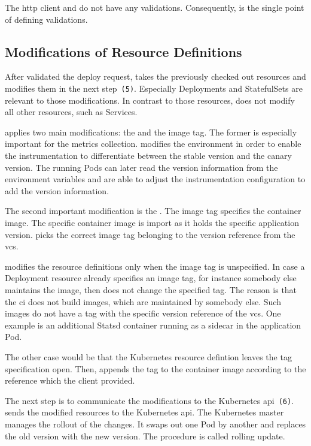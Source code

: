 The \gls{http} client and \depctl{} do not have any validations. Consequently, \deployer{} is the
single point of defining validations.

\subsection{Modifications of Resource Definitions}

After \deployer{} validated the deploy request, \deployer{} takes the previously checked out
resources and modifies them in the next step~\texttt{(5)}. Especially Deployments and
StatefulSets are relevant to those modifications. In contrast to those resources, \deployer{}
does not modify all other resources, such as Services.

\deployer{} applies two main modifications: the  and the image tag. The
former is especially important for the metrics collection. \deployer{} modifies the
environment in order to enable the instrumentation to differentiate between the stable
version and the canary version. The running Pods can later read the version information
from the environment variables and are able to adjust the instrumentation configuration to
add the version information.

The second important modification is the . The image tag specifies the
container image. The specific container image is import as it holds the specific
application version. \deployer{} picks the correct image tag belonging to the version
reference from the \gls{vcs}.

\deployer{} modifies the resource definitions only when the image tag is unspecified. In
case a Deployment resource already specifies an image tag, for instance somebody else
maintains the image, then \deployer{} does not change the specified tag. The reason is that
the \gls{ci} does not build images, which are maintained by somebody else. Such images do
not have a tag with the specific version reference of the \gls{vcs}. One example is an
additional Statsd container running as a sidecar in the application Pod.

The other case would be that the Kubernetes resource defintion leaves the tag
specification open. Then, \deployer{} appends the tag to the container image according to
the reference which the client provided.

The next step is to communicate the modifications to the Kubernetes
\gls{api}~\texttt{(6)}. \deployer{} sends the modified resources to the Kubernetes \gls{api}. The
Kubernetes master manages the rollout of the changes. It swaps out one Pod by another and
replaces the old version with the new version. The procedure is called rolling update.


